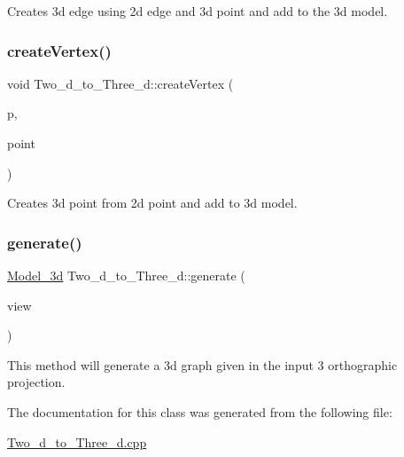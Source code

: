 Creates 3d edge using 2d edge and 3d point and add to the 3d model. \mbox{\label{class_two__d__to___three__d_af07f101d864509449c07fafa196ece16}} 
\subsubsection{\texorpdfstring{create\+Vertex()}{createVertex()}}
{\footnotesize\ttfamily void Two\+\_\+d\+\_\+to\+\_\+\+Three\+\_\+d\+::create\+Vertex (\begin{DoxyParamCaption}\item[{\hyperlink{class_projection}{Projection}}]{p,  }\item[{\hyperlink{class_point2_d}{Point2D}}]{point }\end{DoxyParamCaption})}

Creates 3d point from 2d point and add to 3d model. \mbox{\label{class_two__d__to___three__d_ad9bd5587ebe1fc4e80ecc1587c2745ff}} 
\subsubsection{\texorpdfstring{generate()}{generate()}}
{\footnotesize\ttfamily \hyperlink{class_model__3d}{Model\+\_\+3d} Two\+\_\+d\+\_\+to\+\_\+\+Three\+\_\+d\+::generate (\begin{DoxyParamCaption}\item[{Orthogarphic\+View}]{view }\end{DoxyParamCaption})}

This method will generate a 3d graph given in the input 3 orthographic projection. 

The documentation for this class was generated from the following file\+:\begin{DoxyCompactItemize}
\item 
\hyperlink{_two__d__to___three__d_8cpp}{Two\+\_\+d\+\_\+to\+\_\+\+Three\+\_\+d.\+cpp}\end{DoxyCompactItemize}
